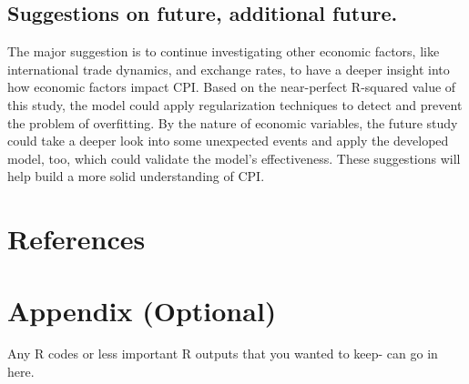 \documentclass[
  man,floatsintext,
  man]{apa6}
\begin{document}
\hypertarget{suggestions-on-future-additional-future.}{%
\subsection{Suggestions on future, additional future.}\label{suggestions-on-future-additional-future.}}

The major suggestion is to continue investigating other economic factors, like international trade dynamics, and exchange rates, to have a deeper insight into how economic factors impact CPI. Based on the near-perfect R-squared value of this study, the model could apply regularization techniques to detect and prevent the problem of overfitting. By the nature of economic variables, the future study could take a deeper look into some unexpected events and apply the developed model, too, which could validate the model's effectiveness. These suggestions will help build a more solid understanding of CPI.

\newpage

\hypertarget{references}{%
\section{References}\label{references}}

\hypertarget{appendix-optional}{%
\section{Appendix (Optional)}\label{appendix-optional}}

Any R codes or less important R outputs that you wanted to keep- can go in here.


\printbibliography
\end{document}

